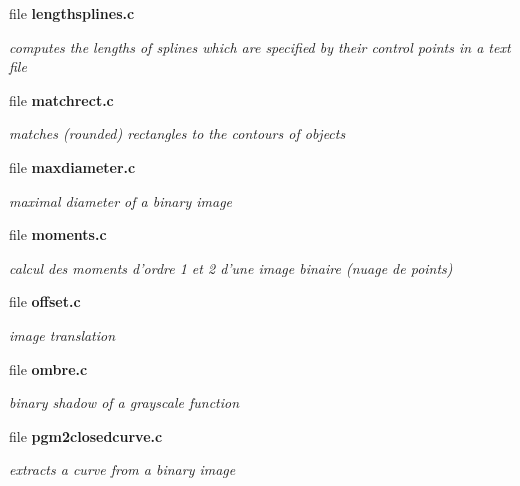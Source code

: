 \begin{CompactItemize}
\item 
file \bf{lengthsplines.c}
\begin{CompactList}\small\item\em computes the lengths of splines which are specified by their control points in a text file \item\end{CompactList}

\item 
file \bf{matchrect.c}
\begin{CompactList}\small\item\em matches (rounded) rectangles to the contours of objects \item\end{CompactList}

\item 
file \bf{maxdiameter.c}
\begin{CompactList}\small\item\em maximal diameter of a binary image \item\end{CompactList}

\item 
file \bf{moments.c}
\begin{CompactList}\small\item\em calcul des moments d'ordre 1 et 2 d'une image binaire (nuage de points) \item\end{CompactList}

\item 
file \bf{offset.c}
\begin{CompactList}\small\item\em image translation \item\end{CompactList}

\item 
file \bf{ombre.c}
\begin{CompactList}\small\item\em binary shadow of a grayscale function \item\end{CompactList}

\item 
file \bf{pgm2closedcurve.c}
\begin{CompactList}\small\item\em extracts a curve from a binary image \item\end{CompactList}


\end{CompactItemize}
